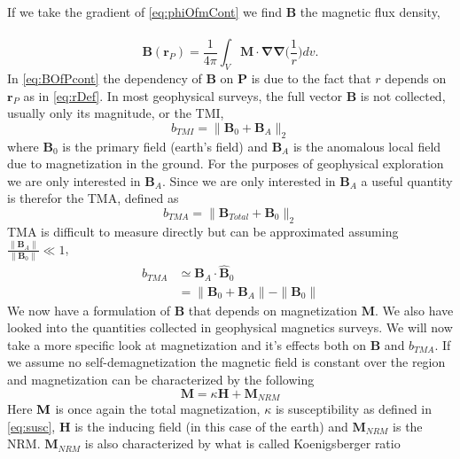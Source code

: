If we take the gradient of \autoref{eq:phiOfmCont} we find $\mathbf B$ the magnetic flux density,\\\\
\begin{equation}\label{eq:BOfPcont}
\mathbf B (\mathbf r_P) = \frac{1}{4\pi}\int_V\mathbf M\cdot \mathbf{\nabla}\mathbf{\nabla}\Big(\frac{1}{r}\Big)dv.
\end{equation}
In \autoref{eq:BOfPcont} the dependency of $\mathbf B$ on $\mathbf P$ is due to the fact that $r$ depends on $\mathbf r_P$ as in \autoref{eq:rDef}. In most geophysical surveys, the full vector $\mathbf B$ is not collected, usually only its magnitude, or the \ac{TMI},
\begin{equation}\label{eq:TMI}
b_{TMI} = \| \mathbf B_0 + \mathbf B_A\|_2
\end{equation}
where $\mathbf B_0$ is the primary field (earth's field) and $\mathbf B_A$ is the anomalous local field due to magnetization in the ground. For the purposes of geophysical exploration we are only interested in $\mathbf B_A$. Since we are only interested in $\mathbf B_A$ a useful quantity is therefor the \ac{TMA}, defined as
\begin{equation}\label{eq:TMA}
b_{TMA} = \| \mathbf B_{Total} + \mathbf B_0\|_2
\end{equation}
\ac{TMA} is difficult to measure directly but can be approximated assuming $\frac{\|\mathbf B_A\|}{\|\mathbf B_0\|} \ll 1$,
\begin{align}\label{eq:TMAaprox}
b_{TMA} &\simeq \mathbf B_A\cdot \hat{\mathbf B}_0\\
&=\|\mathbf B_0+\mathbf B_A\| - \|\mathbf B_0\|
\end{align}
We now have a formulation of $\mathbf B$ that depends on magnetization $\mathbf M$. We also have looked into the quantities collected in geophysical magnetics surveys. We will now take a more specific look at magnetization and it's effects both on $\mathbf B$ and $b_{TMA}$. If we assume no self-demagnetization the magnetic field is constant over the region and magnetization can be characterized by the following
\begin{equation} \label{eq:magnetization}
\textbf{M} = \kappa\textbf{H} + \textbf{M}_{NRM}
\end{equation}
Here $\textbf M$ is once again the total magnetization, $\kappa$ is susceptibility as defined in \autoref{eq:susc}, $\textbf{H}$ is the inducing field (in this case of the earth) and $\textbf{M}_{NRM}$ is the \ac{NRM}. $\textbf{M}_{NRM}$  is also characterized by what is called Koenigsberger ratio
